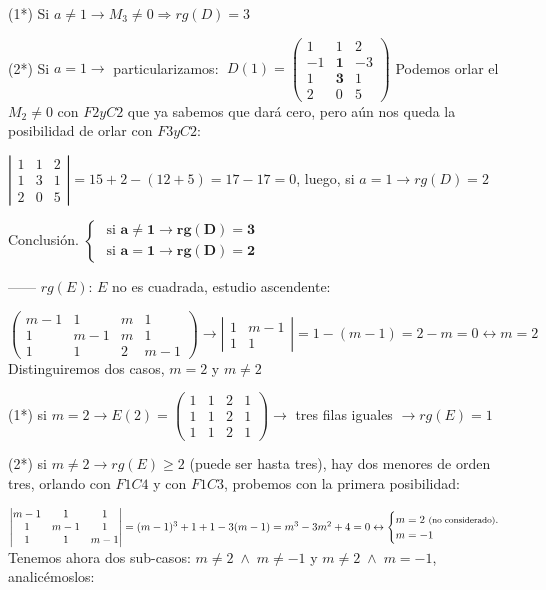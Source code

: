 \begin{proofw}
(1*) Si $a\neq 1\to M_3\neq 0 \Rightarrow rg(D)=3$

(2*) Si $a=1\to $ particularizamos: $\;  D(1)=\left( \begin{matrix} \boxed{1}&1&\boxed{2}\\-1&\boldsymbol{1}&-3\\1&\boldsymbol{3}&1\\\boxed{2}&0&\boxed{5}  \end{matrix} \right) $ Podemos orlar el $M_2\neq 0$ con $F2 y C2$ que ya sabemos que dará cero, pero aún nos queda la posibilidad de orlar con $F3 y C2$:

$\left| \begin{matrix} 1&1&2\\1&3&1\\2&0&5 \end{matrix} \right|= 15+2-(12+5)=17-17=0 $, luego, si $a=1 \to rg(D)=2$

Conclusión. $\begin{cases} \text{ si } \boldsymbol{a\neq 1 \to rg(D)=3} \\ \text{ si } \boldsymbol{a=1 \to rg(D)=2}  \end{cases}$


------ $rg(E)$: $E$ no es cuadrada, estudio ascendente: 


$\left( \begin{matrix} m-1&1&m&1\\ \boxed{1}&\boxed{m-1}&m&1\\\boxed{1}&\boxed{1}&2&m-1  \end{matrix} \right) \to \left| \begin{matrix} 1&m-1\\1&1 \end{matrix} \right|= 1-(m-1)=2-m=0 \leftrightarrow m=2   $ Distinguiremos dos casos, $m=2$ y $m\neq 2$

(1*) si $m=2\to E(2)=\left( \begin{matrix} 1&1&2&1\\1&1&2&1\\1&1&2&1\end{matrix} \right) \to $ tres filas iguales $\to rg(E)=1$

(2*) si $m\neq 2 \to rg(E)\ge 2$ (puede ser hasta tres), hay dos menores de orden tres, orlando con $F1C4$ y con $F1C3$, probemos con la primera posibilidad:

$\left| \begin{matrix} m-1&1&1\\1&m-1&1\\1&1&m-1 \end{matrix} \right|=(m-1)^3+1+1-3(m-1)=m^3-3m^2+4=0 \leftrightarrow \begin{cases}  m=2 \text{ \footnotesize{(no considerado)}\normalsize{.}} \\ m=-1 \end{cases}$ Tenemos ahora dos sub-casos: $m\neq 2 \; \wedge \; m\neq -1$ y $m\neq 2 \; \wedge \; m= -1$, analicémoslos:


\end{proofw}
